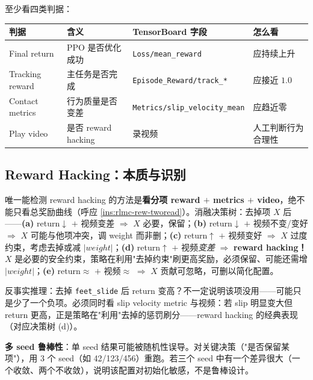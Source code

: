至少看四类判据：

\begin{center}
\small
\begin{tabular}{@{}llll@{}}
\toprule
判据 & 含义 & TensorBoard 字段 & 怎么看 \\
\midrule
Final return & PPO 是否优化成功 & \verb|Loss/mean_reward| & 应持续上升 \\
Tracking reward & 主任务是否完成 & \verb|Episode_Reward/track_*| & 应接近 $1.0$ \\
Contact metrics & 行为质量是否变差 & \verb|Metrics/slip_velocity_mean| & 应趋近零 \\
Play video & 是否 reward hacking & 录视频 & 人工判断行为合理性 \\
\bottomrule
\end{tabular}
\end{center}

\subsection{Reward Hacking：本质与识别}
\label{sec:rlmc-rew-hacking}

\begin{insight}\label{ins:rlmc-rew-hacking}
唯一能检测 reward hacking 的方法是\textbf{看分项 reward $+$ metrics $+$ video}，绝不能只看总奖励曲线（呼应 \cref{ins:rlmc-rew-tworead}）。消融决策树：去掉项 $X$ 后——\textbf{(a)} return$\downarrow$ $+$ 视频变差 $\Rightarrow$ $X$ 必要，保留；\textbf{(b)} return$\downarrow$ $+$ 视频不变/变好 $\Rightarrow$ $X$ 可能与他项冲突，调 weight 而非删；\textbf{(c)} return$\uparrow$ $+$ 视频变好 $\Rightarrow$ $X$ 过度约束，考虑去掉或减 $|weight|$；\textbf{(d)} return$\uparrow$ $+$ 视频\emph{变差} $\Rightarrow$ \textbf{reward hacking！}$X$ 是必要的安全约束，策略在利用"去掉约束"刷更高奖励，必须保留、可能还需增 $|weight|$；\textbf{(e)} return$\approx$ $+$ 视频$\approx$ $\Rightarrow$ $X$ 贡献可忽略，可删以简化配置。
\end{insight}

反事实推理：去掉 \verb|feet_slide| 后 return 变高？不一定说明该项没用——可能只是少了一个负项。必须同时看 slip velocity metric 与视频：若 slip 明显变大但 return 更高，正是策略在"利用"去掉的惩罚刷分——reward hacking 的经典表现（对应决策树 (d)）。

\textbf{多 seed 鲁棒性}：单 seed 结果可能被随机性误导。对关键决策（"是否保留某项"），用 $3$ 个 seed（如 42/123/456）重跑。若三个 seed 中有一个差异很大（一个收敛、两个不收敛），说明该配置对初始化敏感，不是鲁棒设计。


